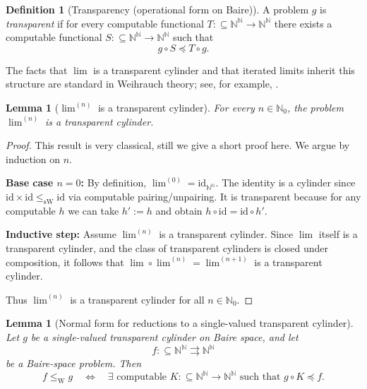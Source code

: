 \documentclass{lmcs} %
\theoremstyle{plain}
\theoremstyle{plain}
\newtheorem{lemma}[theorem]{Lemma}
\theoremstyle{definition}
\newtheorem{definition}[theorem]{Definition}
\theoremstyle{remark}
\theoremstyle{definition}
\theoremstyle{remark}
\numberwithin{equation}{section}
\newcommand{\N}{\mathbb{N}}
\newcommand{\NN}{\mathbb{N}}
\newcommand{\Lim}{\operatorname{lim}}
\newcommand{\Limi}[1]{\Lim^{(#1)}}
\begin{document}
\begin{definition}[Transparency (operational form on Baire)]\label{def:transparent}
A problem $g$ is \textit{transparent} if for every computable functional
$T:\subseteq\NN^\NN \to\NN^\NN$ there exists a computable functional
$S:\subseteq\NN^\NN \to\NN^\NN$ such that
\[
g \circ S \preceq T \circ g .
\]
\end{definition}

The facts that \(\Lim\) is a transparent cylinder and that iterated limits inherit this structure are standard in Weihrauch theory; see, for example,
\cite[Section~6, Theorem~6.5]{brattka2021weihrauch}.

\begin{lemma}[$\Limi{n}$ is a transparent cylinder]{\label{lem:limntranspcyl}}
For every $n\in\N_0$, the problem $\Limi{n}$ is a transparent cylinder.
\end{lemma}

\begin{proof}
This result is very classical, still we give a short proof here. We argue by induction on $n$.

\textbf{Base case $n=0$:} By definition, $\Limi{0}=\mathrm{id}_{\NN^{\NN}}$.
The identity is a cylinder since $\mathrm{id}\times \mathrm{id}\le_{\mathrm{sW}}\mathrm{id}$
via computable pairing/unpairing. It is transparent because for any computable $h$ we can take
$h':=h$ and obtain $h\circ \mathrm{id}=\mathrm{id}\circ h'$.

\textbf{Inductive step:} Assume $\Limi{n}$ is a transparent cylinder. Since $\Lim$ itself is a
transparent cylinder, and the class of transparent cylinders is closed under composition,
it follows that $\Lim\circ \Limi{n}=\Limi{n+1}$ is a transparent cylinder.

Thus $\Limi{n}$ is a transparent cylinder for all $n\in\NN_0$.
\end{proof}

\begin{lemma}[Normal form for reductions to a single-valued transparent cylinder]{\label{lem:TowerNormalForm}}
Let $g$ be a \textit{single-valued} transparent cylinder on Baire space, and let
\[
        f:\subseteq\mathbb N^{\mathbb N}\rightrightarrows\mathbb N^{\mathbb N}
\]
be a Baire-space problem. Then
\[
f \leq_{\mathrm W} g
\quad\Longleftrightarrow\quad
\exists\text{ computable }K:\subseteq\mathbb{N}^\mathbb{N}\to\mathbb{N}^\mathbb{N}
\text{ such that } g \circ K \preceq f.
\]
\end{lemma}
\end{document}
